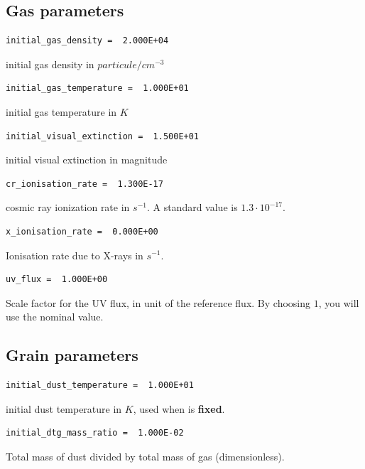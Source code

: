 \documentclass[english,a4paper,twoside]{article}
\begin{document}
\subsection{Gas parameters}


\begin{verbatim}
initial_gas_density =  2.000E+04
\end{verbatim}
initial gas density in $\unit{particule/cm^{-3}}$

\begin{verbatim}
initial_gas_temperature =  1.000E+01
\end{verbatim}
initial gas temperature  in $\unit{K}$

\begin{verbatim}
initial_visual_extinction =  1.500E+01
\end{verbatim}
initial visual extinction in magnitude

\begin{verbatim}
cr_ionisation_rate =  1.300E-17
\end{verbatim}
cosmic ray ionization rate in $\unit{s^{-1}}$. A standard value is $1.3\cdot 10^{-17}$.

\begin{verbatim}
x_ionisation_rate =  0.000E+00
\end{verbatim}
Ionisation rate due to X-rays in $\unit{s^{-1}}$.

\begin{verbatim}
uv_flux =  1.000E+00
\end{verbatim}
Scale factor for the UV flux, in unit of the reference flux. By choosing $1$, you will use the nominal value.

\subsection{Grain parameters}
\begin{verbatim}
initial_dust_temperature =  1.000E+01
\end{verbatim}
initial dust temperature in $\unit{K}$, used when  is \textbf{fixed}.

\begin{verbatim}
initial_dtg_mass_ratio =  1.000E-02
\end{verbatim}
Total mass of dust divided by total mass of gas (dimensionless).
\end{document}
